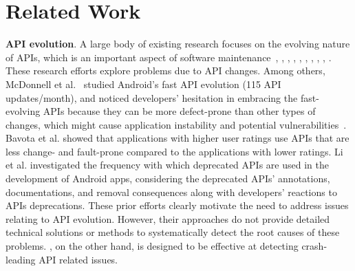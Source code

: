 \section{Related Work}\label{sec-related}
\vspace{-0.1cm}

\textbf{API evolution}. A large body of existing
research focuses on the evolving nature of APIs, which
is an important aspect of software
maintenance~\cite{mcdonnell2013empirical},
\cite{bavota2015impact}, \cite{ACRYL_Scalabrino2019},
\cite{li2018characterising},
\cite{lamothe2018exploring}, \cite{linares2013api},
\cite{Luo2018},
\cite{Fazzini:2017:ACI:3155562.3155604},
\cite{mahmoudi2018android}, \cite{mutchler2016target}.
These research efforts explore problems due to API
changes. Among others, McDonnell et
al.~\cite{mcdonnell2013empirical} studied Android's
fast API evolution (115 API updates/month), and noticed
developers' hesitation in embracing the fast-evolving
APIs because they can be more defect-prone than other
types of changes, which might cause application
instability and potential
vulnerabilities~\cite{linares2013api}.  
Bavota et al.  \cite{bavota2015impact}
showed that applications with higher user ratings use
APIs that are less change- and fault-prone compared to
the applications with lower ratings. 
Li et al.  \cite{li2018characterising} investigated the
frequency with which deprecated APIs are used in the
development of Android apps, considering the deprecated
APIs' annotations, documentations, and removal
consequences along with developers' reactions to APIs
deprecations. 
%
%
%
%
These prior efforts clearly motivate the need to address
issues relating to API evolution.  However, their
approaches do not provide detailed technical solutions or
methods to systematically detect the root causes of these
problems.  \textsc{\@approach}, on the other hand, is
designed to be effective at detecting crash-leading API
related issues.


